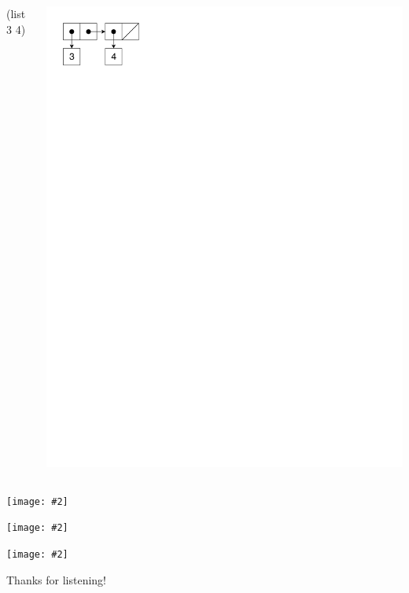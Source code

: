 \documentclass[UKenglish,usenames,dvipsnames,svgnames,table,aspectratio=169,mathserif]{beamer}
\newcommand{\imageslide}[2][1]{{
\begin{frame}\begin{center}
\texttt{[image: \#2]}
\end{center}\end{frame}
}}
\begin{document}
\begin{frame}[fragile]
\begin{columns}[T]
\begin{schemecode}
  (list 3 4)
\end{schemecode}
\includegraphics{list-cons2.pdf}
\end{columns}
\end{frame}


\imageslide[0.7]{list-cons-racket.png}


\imageslide[1.3]{pushout1.pdf}
\imageslide[1.3]{pushout2.pdf}


\begin{frame}
\huge \centering
Thanks for listening!
\end{frame}


\end{document}
